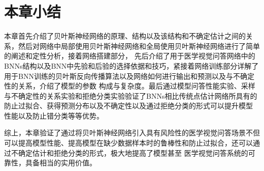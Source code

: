 \section{本章小结}
本章首先介绍了贝叶斯神经网络的原理、结构以及该结构和不确定估计之间的关系，然后对网络中局部使用贝叶斯神经网络和全局使用贝叶斯神经网络进行了简单的阐述和定性分析，接着网络搭建部分，
先后介绍了用于医学视觉问答网络中的BNNs结构以及BNN中先验和后验的选择依据和技巧，紧接着网络训练部分详解了用于BNN训练的贝叶斯反向传播算法以及网络如何进行输出和预测以及与不确定性的关系，介绍了模型的参数
构成与复杂度。最后通过模型问答性能实验、采样与不确定性的关系实验和拒绝分类实验验证了BNNs相比传统点估计网络所具有的防止过拟合、获得预测分布以及不确定性以及通过拒绝分类的形式可以提升模型
性能以及防止错分类等等优势。

综上，本章验证了通过将贝叶斯神经网络引入具有风险性的医学视觉问答场景不但可以提高模型性能、提高模型在缺少数据样本时的鲁棒性和防止过拟合，还可以通过不确定估计和拒绝分类的形式，极大地提高了模型甚至
医学视觉问答系统的可靠性，具备相当的实用价值。



